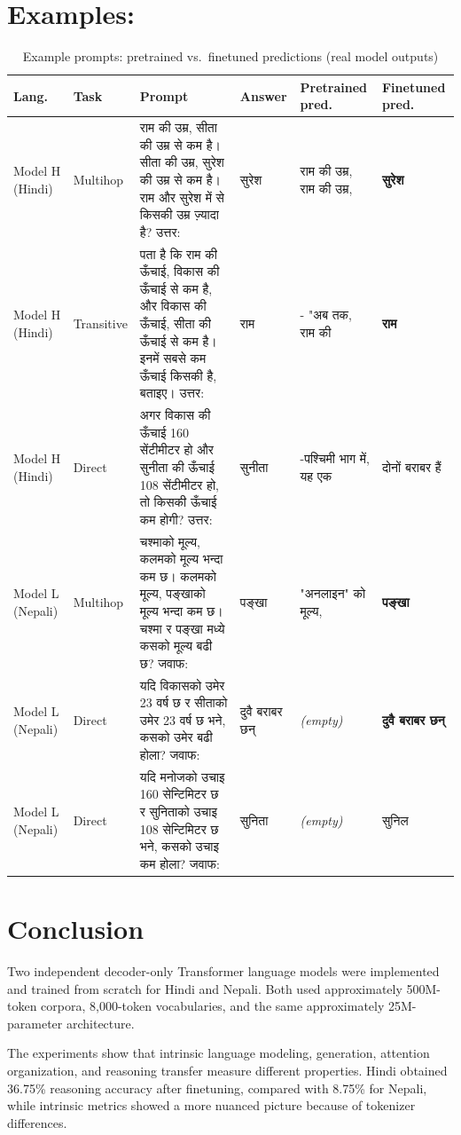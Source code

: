 \documentclass[10pt,a4paper]{article}
\newcommand{\deva}[1]{{\devanagarifont #1}}
\begin{document}
\section{Examples:}
\begin{table}[H]\centering
\caption{Example prompts: pretrained vs.\ finetuned predictions (real model outputs)}
\small
\begin{tabular}{p{1.3cm}p{1cm}p{5.2cm}p{1.6cm}p{2.6cm}p{1.6cm}}\toprule
Lang.\ & Task & Prompt & Answer & Pretrained pred. & Finetuned pred.\\\midrule
Model H (Hindi) & Multihop & \deva{राम की उम्र, सीता की उम्र से कम है। सीता की उम्र, सुरेश की उम्र से कम है। राम और सुरेश में से किसकी उम्र ज़्यादा है? उत्तर}: & \deva{सुरेश} & \deva{राम की उम्र, राम की उम्र}, & \textbf{\deva{सुरेश}}\\
Model H (Hindi) & Transitive & \deva{पता है कि राम की ऊँचाई, विकास की ऊँचाई से कम है, और विकास की ऊँचाई, सीता की ऊँचाई से कम है। इनमें सबसे कम ऊँचाई किसकी है, बताइए। उत्तर}: & \deva{राम} & - "\deva{अब तक, राम की} & \textbf{\deva{राम}}\\
Model H (Hindi) & Direct & \deva{अगर विकास की ऊँचाई 160 सेंटीमीटर हो और सुनीता की ऊँचाई 108 सेंटीमीटर हो, तो किसकी ऊँचाई कम होगी? उत्तर}: & \deva{सुनीता} & -\deva{पश्चिमी भाग में, यह एक} & \deva{दोनों बराबर हैं}\\
Model L (Nepali) & Multihop & \deva{चश्माको मूल्य, कलमको मूल्य भन्दा कम छ। कलमको मूल्य, पङ्खाको मूल्य भन्दा कम छ। चश्मा र पङ्खा मध्ये कसको मूल्य बढी छ? जवाफ}: & \deva{पङ्खा} & "\deva{अनलाइन" को मूल्य}, & \textbf{\deva{पङ्खा}}\\
Model L (Nepali) & Direct & \deva{यदि विकासको उमेर 23 वर्ष छ र सीताको उमेर 23 वर्ष छ भने, कसको उमेर बढी होला? जवाफ}: & \deva{दुवै बराबर छन्} & \textit{(empty)} & \textbf{\deva{दुवै बराबर छन्}}\\
Model L (Nepali) & Direct & \deva{यदि मनोजको उचाइ 160 सेन्टिमिटर छ र सुनिताको उचाइ 108 सेन्टिमिटर छ भने, कसको उचाइ कम होला? जवाफ}: & \deva{सुनिता} & \textit{(empty)} & \deva{सुनिल}\\
\bottomrule\end{tabular}
\end{table}


\section{Conclusion}
Two independent decoder-only Transformer language models were
implemented and trained from scratch for Hindi and Nepali. Both used
approximately 500M-token corpora, 8,000-token vocabularies, and the
same approximately 25M-parameter architecture.

The experiments show that intrinsic language modeling, generation,
attention organization, and reasoning transfer measure different
properties. Hindi obtained 36.75\% reasoning accuracy after
finetuning, compared with 8.75\% for Nepali, while intrinsic metrics
showed a more nuanced picture because of tokenizer differences.
\end{document}
